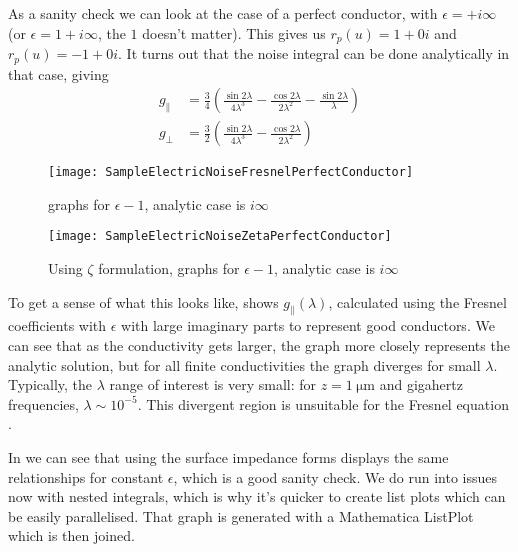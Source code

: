 \documentclass[11pt]{article}
\begin{document}
	As a sanity check we can look at the case of a perfect conductor, with $\epsilon = + i \infty$ (or $\epsilon = 1 + i \infty$, the $1$ doesn't matter).
	This gives us $r_p(u) = 1 + 0 i$ and $r_p(u) = -1 + 0 i$.
	It turns out that the noise integral can be done analytically in that case, giving
	\begin{align}
		g_{\parallel} &= \frac{3}{4} \left(\frac{\sin{2 \lambda}}{4 \lambda^3} - \frac{\cos{2 \lambda}}{2 \lambda^2} - \frac{\sin{2 \lambda}}{\lambda}\right) \\
		g_{\perp} &= \frac32 \left( \frac{\sin{2 \lambda}}{4 \lambda^3} - \frac{\cos{2 \lambda}}{2 \lambda^2} \right)
	\end{align}

	\begin{figure}[htp]
		\centering
		\texttt{[image: SampleElectricNoiseFresnelPerfectConductor]}
		\caption{graphs for $\epsilon - 1$, analytic case is $i \infty$} \label{fig:SampleElectricNoiseFresnelPerfect}
	\end{figure}

	\begin{figure}[htp]
		\centering
		\texttt{[image: SampleElectricNoiseZetaPerfectConductor]}
		\caption{Using $\zeta$ formulation, graphs for $\epsilon - 1$, analytic case is $i \infty$} \label{fig:SampleElectricNoiseZetaPerfect}
	\end{figure}

	To get a sense of what this looks like,  shows $g_{\parallel}(\lambda)$, calculated using the Fresnel coefficients with $\epsilon$ with large imaginary parts to represent good conductors.
	We can see that as the conductivity gets larger, the graph more closely represents the analytic solution, but for all finite conductivities the graph diverges for small $\lambda$.
	Typically, the $\lambda$ range of interest is very small: for $z = \SI{1}{\micro\meter}$ and gigahertz frequencies, $\lambda \sim 10^{-5}$.
	This divergent region is unsuitable for the Fresnel equation .

	In  we can see that using the surface impedance forms displays the same relationships for constant $\epsilon$, which is a good sanity check.
	We do run into issues now with nested integrals, which is why it's quicker to create list plots which can be easily parallelised.
	That graph is generated with a Mathematica ListPlot which is then joined.
\end{document}

